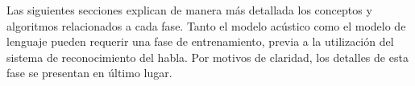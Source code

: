 Las siguientes secciones explican de manera m\'as detallada los conceptos y algoritmos relacionados a cada fase.
Tanto el modelo ac\'ustico como el modelo de lenguaje pueden requerir una fase de entrenamiento, 
previa a la utilizaci\'on del sistema de reconocimiento del habla.
Por motivos de claridad, los detalles de esta fase se presentan en \'ultimo lugar.



